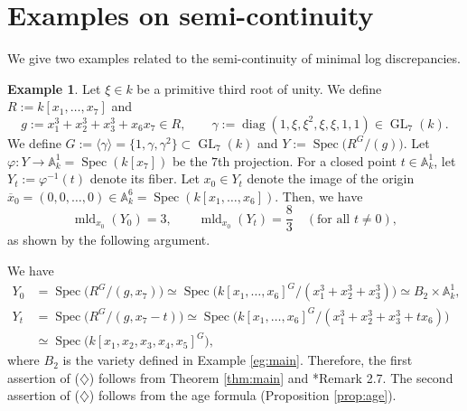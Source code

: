 \documentclass[a4paper,11pt]{amsart}
\theoremstyle{definition}
\newtheorem{eg}[thm]{Example}
\theoremstyle{remark}
\begin{document}
\section{Examples on semi-continuity}\label{section:LSC}

We give two examples related to the semi-continuity of minimal log discrepancies. 

\begin{eg}\label{eg:family}
Let $\xi \in k$ be a primitive third root of unity. 
We define $R := k[x_1, \ldots , x_{7}]$ and 
\[
g := x_1 ^3 + x_2 ^3 + x_3 ^3 + x_6 x_7 \in R, \qquad
\gamma := \operatorname{diag} (1, \xi, \xi^2, \xi, \xi , 1, 1) \in \operatorname{GL}_{7}(k). 
\]
We define $G := \langle \gamma \rangle = \{ 1, \gamma , \gamma^2 \} \subset \operatorname{GL}_{7}(k)$ and 
$Y := \operatorname{Spec} \bigl (R^G/(g) \bigr)$. 
Let $\varphi: Y \to \mathbb{A}^1_k = \operatorname{Spec} (k[x_7])$ be the $7$th projection. 
For a closed point $t \in \mathbb{A}^1_k$, let $Y_t := \varphi^{-1}(t)$ denote its fiber. 
Let $x_0 \in Y_t$ denote the image of the origin $\overline{x}_0 = (0, 0, \ldots, 0) \in \mathbb{A}^6 _k = \operatorname{Spec}(k[x_1, \ldots, x_6])$. 
Then, we have 
\[
\operatorname{mld}_{x_0}(Y_0) = 3 , \qquad
\operatorname{mld}_{x_0}(Y_t) = \frac{8}{3} \quad (\text{for all $t \not = 0$}), 
\tag{$\diamondsuit$}
\]
as shown by the following argument. 

We have 
\begin{align*}
Y_0 
&= \operatorname{Spec} \bigl (R^G/(g, x_7) \bigr) 
\simeq \operatorname{Spec} \bigl (k[x_1,\ldots, x_6]^G/(x_1 ^3 + x_2 ^3 + x_3 ^3) \bigr) 
\simeq B_2 \times \mathbb{A}^1_k, \\
Y_t 
&= \operatorname{Spec} \bigl (R^G/(g, x_7-t) \bigr) 
\simeq \operatorname{Spec} \bigl (k[x_1,\ldots, x_6]^G/(x_1 ^3 + x_2 ^3 + x_3 ^3+tx_6) \bigr) \\
&\simeq \operatorname{Spec} \bigl( k[x_1, x_2, x_3, x_4, x_5] ^G \bigr), 
\end{align*}
where $B_2$ is the variety defined in Example \ref{eg:main}. 
Therefore, the first assertion of ($\diamondsuit$) follows from Theorem \ref{thm:main} and \cite{Amb99}*{Remark 2.7}. 
The second assertion of ($\diamondsuit$) follows from the age formula (Proposition \ref{prop:age}). 
\end{eg}
\end{document}
